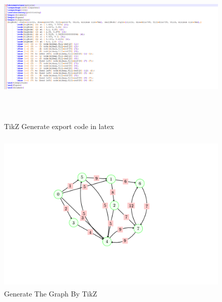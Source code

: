 \documentclass[a4paper,10pt]{article}
\begin{document}
\paragraph{}
\begin{figure}[H]
		\centering
		\includegraphics[height = 3in]{tikz_code_export.png}
		\caption[Optional caption]{TikZ Generate export code in latex}
		\label{fig:Repository}
	\end{figure}
\paragraph{}
\begin{figure}[H]
		\centering
		\includegraphics[height = 3in]{tikz_graph_image.png}
		\caption[Optional caption]{Generate The Graph By TikZ}
		\label{fig:Repository}
	\end{figure}
\end{document}
